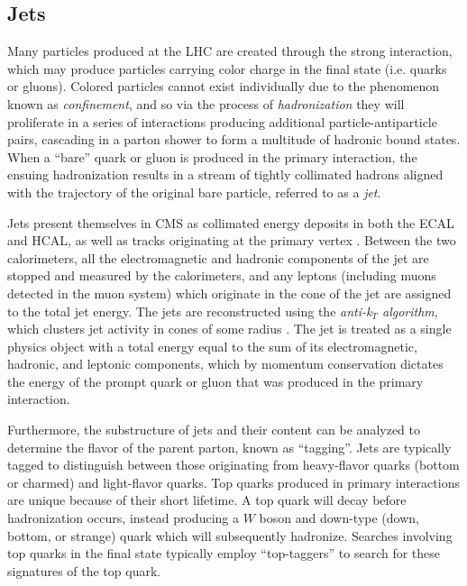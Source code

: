 \subsection{Jets}
\label{subsec:jets}
Many particles produced at the LHC are created through the strong interaction, which may produce particles carrying color charge in the final state (i.e. quarks or gluons). Colored particles cannot exist individually due to the phenomenon known as {\it confinement}, and so via the process of {\it hadronization} they will proliferate in a series of interactions producing additional particle-antiparticle pairs, cascading in a parton shower to form a multitude of hadronic bound states. When a ``bare'' quark or gluon is produced in the primary interaction, the ensuing hadronization results in a stream of tightly collimated hadrons aligned with the trajectory of the original bare particle, referred to as a {\it jet}. 

Jets present themselves in CMS as collimated energy deposits in both the ECAL and HCAL, as well as tracks originating at the primary vertex \cite{Schroder:2015czj}. Between the two calorimeters, all the electromagnetic and hadronic components of the jet are stopped and measured by the calorimeters, and any leptons (including muons detected in the muon system) which originate in the cone of the jet are assigned to the total jet energy. The jets are reconstructed using the {\it anti-k$_T$ algorithm}, which clusters jet activity in cones of some radius \cite{Cacciari:2008gp}. The jet is treated as a single physics object with a total energy equal to the sum of its electromagnetic, hadronic, and leptonic components, which by momentum conservation dictates the energy of the prompt quark or gluon that was produced in the primary interaction. 

Furthermore, the substructure of jets and their content can be analyzed to determine the flavor of the parent parton, known as ``tagging''. Jets are typically tagged to distinguish between those originating from heavy-flavor quarks (bottom or charmed) and light-flavor quarks. Top quarks produced in primary interactions are unique because of their short lifetime. A top quark will decay before hadronization occurs, instead producing a $W$ boson and down-type (down, bottom, or strange) quark which will subsequently hadronize. Searches involving top quarks in the final state typically employ ``top-taggers'' to search for these signatures of the top quark.

